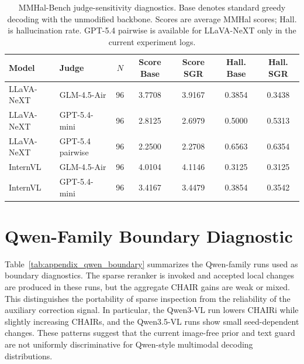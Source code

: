\documentclass[11pt]{article}
\begin{document}
\begin{table}[t]
  \centering
  \small
  \setlength{\tabcolsep}{4.5pt}
  \begin{tabular}{llccccc}
  \hline
  Model & Judge & $N$ & Score Base & Score SGR & Hall. Base & Hall. SGR \\
  \hline
  LLaVA-NeXT & GLM-4.5-Air & 96 & 3.7708 & 3.9167 & 0.3854 & 0.3438 \\
  LLaVA-NeXT & GPT-5.4-mini & 96 & 2.8125 & 2.6979 & 0.5000 & 0.5313 \\
  LLaVA-NeXT & GPT-5.4 pairwise & 96 & 2.2500 & 2.2708 & 0.6563 & 0.6354 \\
  \hline
  InternVL & GLM-4.5-Air & 96 & 4.0104 & 4.1146 & 0.3125 & 0.3125 \\
  InternVL & GPT-5.4-mini & 96 & 3.4167 & 3.4479 & 0.3854 & 0.3542 \\
  \hline
  \end{tabular}
  \caption{
  MMHal-Bench judge-sensitivity diagnostics.
  Base denotes standard greedy decoding with the unmodified backbone.
  Scores are average MMHal scores; Hall. is hallucination rate.
  GPT-5.4 pairwise is available for LLaVA-NeXT only in the current experiment logs.
  }
  \label{tab:mmhal_judge_checks}
\end{table}

\section{Qwen-Family Boundary Diagnostic}
\label{app:qwen_boundary}

Table~\ref{tab:appendix_qwen_boundary} summarizes the Qwen-family runs used as boundary diagnostics.
The sparse reranker is invoked and accepted local changes are produced in these runs, but the aggregate CHAIR gains are weak or mixed.
This distinguishes the portability of sparse inspection from the reliability of the auxiliary correction signal.
In particular, the Qwen3-VL run lowers CHAIRi while slightly increasing CHAIRs, and the Qwen3.5-VL runs show small seed-dependent changes.
These patterns suggest that the current image-free prior and text guard are not uniformly discriminative for Qwen-style multimodal decoding distributions.
\end{document}
